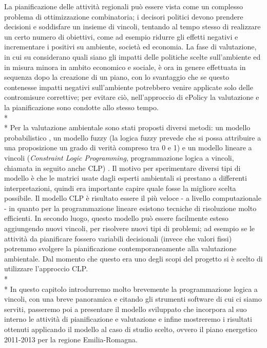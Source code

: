 La pianificazione delle attività regionali può essere vista come un complesso problema di ottimizzazione combinatoria; i decisori politici devono prendere decisioni e soddisfare un insieme di vincoli, tentando al tempo stesso di realizzare un certo numero di obiettivi, come ad esempio ridurre gli effetti negativi e incrementare i positivi su ambiente, società ed economia. La fase di valutazione, in cui su considerano quali siano gli impatti delle politiche scelte sull'ambiente ed in misura minora in ambito economico e sociale, è ora in genere effettuata in sequenza dopo la creazione di un piano, con lo svantaggio che se questo contenesse impatti negativi sull'ambiente potrebbero venire applicate solo delle contromisure correttive; per evitare ciò, nell'approccio di ePolicy la valutazione e la pianificazione sono condotte allo stesso tempo.\\*\\*
Per la valutazione ambientale sono stati proposti diversi metodi: un modello probabilistico \cite{logicDSSstrategicAss}, un modello fuzzy (la logica fuzzy prevede che si possa attribuire a una proposizione un grado di verità compreso tra 0 e 1) \cite{fuzzyLogicstrategicAss} e un modello lineare a vincoli (\emph{Constraint Logic Programming}, programmazione logica a vincoli, chiamata in seguito anche CLP) \cite{GavanelliEtAl}. Il motivo per sperimentare diversi tipi di modello è che le matrici usate dagli esperti ambientali si prestano a differenti interpretazioni, quindi era importante capire quale fosse la migliore scelta possibile. Il modello CLP è risultato essere il più veloce - a livello computazionale - in quanto per la programmazione lineare esistono tecniche di risoluzione molto efficienti. In secondo luogo, questo modello può essere facilmente esteso aggiungendo nuovi vincoli, per risolvere nuovi tipi di problemi; ad esempio se le attività da pianificare fossero variabili decisionali (invece che valori fissi) potremmo svolgere la pianificazione contemporaneamente alla valutazione ambientale. Dal momento che questo era uno degli scopi del progetto si è scelto di utilizzare l'approccio CLP.\\*\\*
In questo capitolo introdurremo molto brevemente la programmazione logica a vincoli, con una breve panoramica e citando gli strumenti software di cui ci siamo serviti, passeremo poi a presentare il modello sviluppato che incorpora al suo interno le attività di pianificazione e valutazione e infine mostreremo i risultati ottenuti applicando il modello al caso di studio scelto, ovvero il piano energetico 2011-2013 per la regione Emilia-Romagna.

